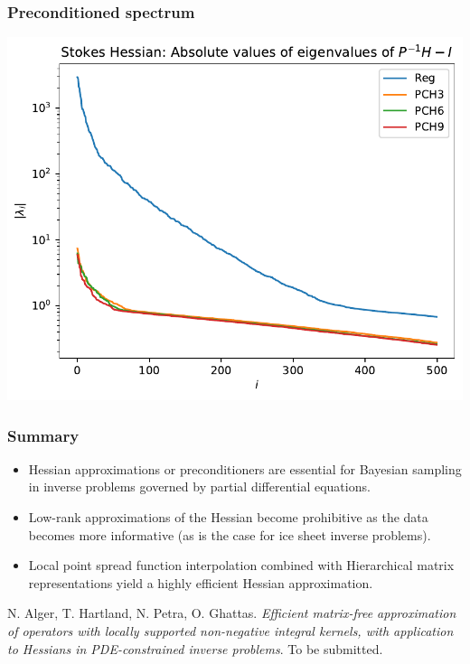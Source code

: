 \documentclass[10pt,final,xcolor=dvipsnames]{beamer}
\begin{document}
\begin{frame}
	\frametitle{Preconditioned spectrum}
	\begin{center}
		\includegraphics[width=0.75\columnwidth]{preconditioned_spectrum.pdf}
	\end{center}
\end{frame}

\begin{frame}
  \frametitle{Summary}

  \begin{itemize}
  	\setlength\itemsep{2em}
  \item Hessian approximations or preconditioners are essential for Bayesian sampling in inverse problems governed by
    partial differential equations.
    \vspace{0.05in}
  \item Low-rank approximations of the Hessian become
    prohibitive as the data becomes more informative (as is the case
    for ice sheet inverse problems).
    \vspace{0.05in}
  \item Local point spread function interpolation combined with Hierarchical matrix representations yield a highly efficient
    Hessian approximation.
  \end{itemize}
    \vspace{0.2in}
    
    {\scriptsize N. Alger, T. Hartland, N. Petra, O. Ghattas. \emph{Efficient matrix-free approximation of operators with locally supported non-negative integral kernels, with application to Hessians in PDE-constrained inverse problems}. To be submitted.}
    
    
\end{frame}
\end{document}
